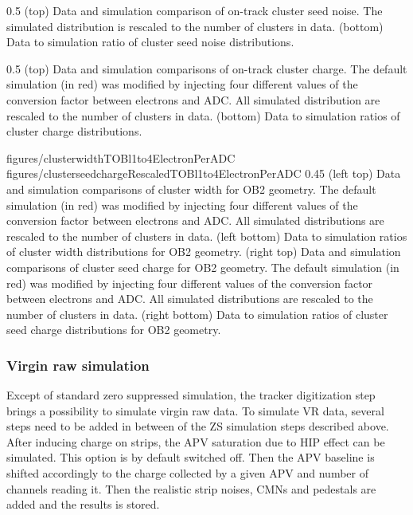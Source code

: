                 {0.5}       %
                 { (top) Data and simulation comparison of on-track cluster seed noise. The simulated distribution is rescaled to the number of clusters in data. (bottom) Data to simulation ratio of cluster seed noise distributions. }


                 {0.5}       %
                 { (top) Data and simulation comparisons of on-track cluster charge. The default simulation (in red) was modified by injecting four different values of the conversion factor between electrons and ADC. All simulated distribution are rescaled to the number of clusters in data. (bottom) Data to simulation ratios of cluster charge distributions. }

                 {figures/clusterwidthTOBl1to4ElectronPerADC}
                 {figures/clusterseedchargeRescaledTOBl1to4ElectronPerADC} %
                 {0.45}       %
                 {(left top) Data and simulation  comparisons of cluster width for OB2 geometry. The default simulation (in red) was modified by injecting four different values of the conversion factor between electrons and ADC. All simulated distributions are rescaled to the number of clusters in data. (left bottom) Data to simulation ratios of cluster width distributions for OB2 geometry. (right top) Data and simulation  comparisons of cluster seed charge for OB2 geometry. The default simulation (in red) was modified by injecting four different values of the conversion factor between electrons and ADC. All simulated distributions are rescaled to the number of clusters in data. (right bottom) Data to simulation ratios of cluster seed charge distributions for OB2 geometry. }

 
\subsubsection{Virgin raw simulation}

Except of standard zero suppressed simulation, the tracker digitization step brings a possibility to simulate virgin raw data. To simulate VR data, several steps need to be added in between of the ZS simulation steps described above. After inducing charge on strips, the APV saturation due to HIP effect can be simulated. This option is by default switched off. Then the APV baseline is shifted accordingly to the charge collected by a given APV and number of channels reading it. Then the realistic strip noises, CMNs and pedestals are added and the results is stored.

